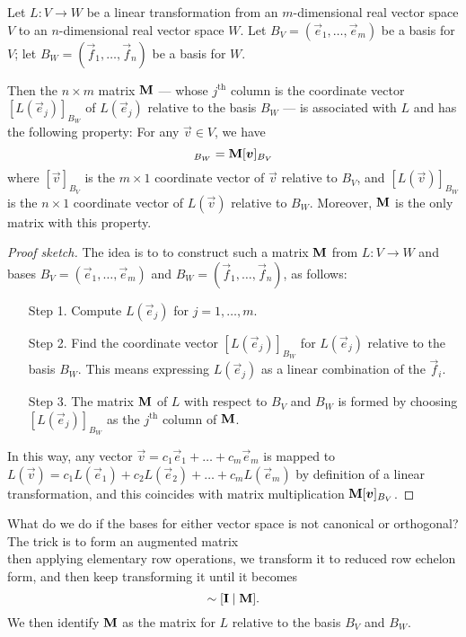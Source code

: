 \begin{theorem}
Let $L\colon V\to W$ be a linear transformation from an $m$-dimensional
real vector space $V$ to an $n$-dimensional real vector space $W$.
Let $B_{V}=(\vec{e}_{1}, \dots, \vec{e}_{m})$ be a basis for $V$; let
$B_{W}=(\vec{f}_{1}, \dots, \vec{f}_{n})$ be a basis for $W$.

Then the $n\times m$ matrix $\mathbf{M}$ --- whose $j^{\text{th}}$ column is
the coordinate vector $[L(\vec{e}_{j})]_{B_{W}}$ of $L(\vec{e}_{j})$
relative to the basis $B_{W}$ --- is associated with $L$ and has the
following property: For any $\vec{v}\in V$, we have
\begin{equation}
[L(\vec{v})]_{B_{W}} = \mat{M}[\vec{v}]_{B_{V}}
\end{equation}
where $[\vec{v}]_{B_{V}}$ is the $m\times1$ coordinate vector of
$\vec{v}$ relative to $B_{V}$, and $[L(\vec{v})]_{B_{W}}$ is the $n\times1$
coordinate vector of $L(\vec{v})$ relative to $B_{W}$. Moreover,
$\mathbf{M}$ is the only matrix with this property.
\end{theorem}

\begin{proof}[Proof sketch]
The idea is to to construct such a matrix $\mathbf{M}$ from $L\colon V\to W$
and bases $B_{V}=(\vec{e}_{1},\dots,\vec{e}_{m})$ and
$B_{W}=(\vec{f}_{1},\dots,\vec{f}_{n})$, as follows:
\begin{itemize}
\item[Step 1.] Compute $L(\vec{e}_{j})$ for $j=1,\dots,m$.
\item[Step 2.] Find the coordinate vector $[L(\vec{e}_{j})]_{B_{W}}$ for
  $L(\vec{e}_{j})$ relative to the basis $B_{W}$. This means expressing
  $L(\vec{e}_{j})$ as a linear combination of the $\vec{f}_{i}$.
\item[Step 3.] The matrix $\mathbf{M}$ of $L$ with respect to $B_{V}$ and
  $B_{W}$ is formed by choosing $[L(\vec{e}_{j})]_{B_{W}}$ as the
  $j^{\text{th}}$ column of $\mathbf{M}$.
\end{itemize}
In this way, any vector $\vec{v} = c_{1}\vec{e}_{1}+\dots+c_{m}\vec{e}_{m}$
is mapped to $L(\vec{v}) = c_{1}L(\vec{e}_{1}) + c_{2}L(\vec{e}_{2}) + \dots + c_{m}L(\vec{e}_{m})$
by definition of a linear transformation, and this coincides with matrix
multiplication $\mathbf{M}[\boldsymbol{v}]_{B_{V}}$.
\end{proof}

\M
What do we do if the bases for either vector space is not canonical or
orthogonal? The trick is to form an augmented matrix
\begin{equation}
[\vec{f}_{1}\quad\dots\quad f_{n}\mid L(\vec{e}_{1})\quad\dots\quad L(\vec{e}_{m})]
\end{equation}
then applying elementary row operations, we transform it to reduced row
echelon form, and then keep transforming it until it becomes
\begin{equation}
[\vec{f}_{1}\quad\dots\quad f_{n}\mid L(\vec{e}_{1})\quad\dots\quad L(\vec{e}_{m})]\sim[\mat{I}\mid\mat{M}].
\end{equation}
We then identify $\mathbf{M}$ as the matrix for $L$ relative to the basis
$B_{V}$ and $B_{W}$.

